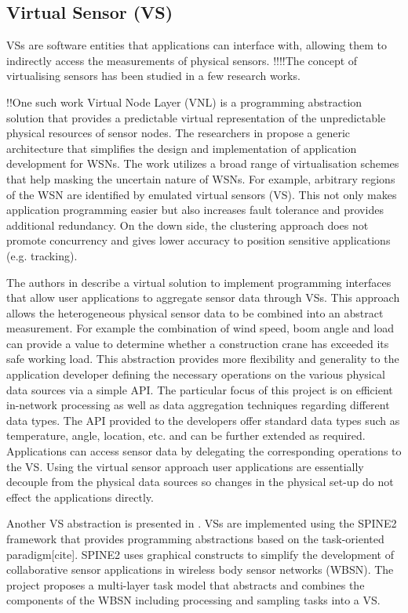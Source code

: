 \subsection{Virtual Sensor (VS)}
VSs are software entities that applications can interface with, allowing them to indirectly access the measurements of physical sensors.
!!!!The concept of virtualising sensors has been studied in a few research works.  

!!One such work Virtual Node Layer (VNL) is a programming abstraction solution that provides a predictable virtual representation of the unpredictable physical resources of sensor nodes. The researchers in \cite{Brown:2007:VNL:1317103.1317105} propose a generic architecture that simplifies the design and implementation of application development for WSNs. The work utilizes a broad range of virtualisation schemes that help masking the uncertain nature of WSNs. For example, arbitrary regions of the WSN are identified by emulated virtual sensors (VS). This not only makes application programming easier but also increases fault tolerance and provides additional redundancy. On the down side, the clustering approach does not promote concurrency and gives lower accuracy to position sensitive applications (e.g. tracking).


The authors in \cite{1648519} describe a virtual solution to implement programming interfaces that allow user applications to aggregate sensor data through VSs. This approach allows the heterogeneous physical sensor data to be combined into an abstract measurement. For example the combination of wind speed, boom angle and load can provide a value to determine whether a construction crane has exceeded its safe working load. This abstraction provides more flexibility and generality to the application developer defining the necessary operations on the various physical data sources via a simple API. The particular focus of this project is on efficient in-network processing as well as data aggregation techniques regarding different data types. The API provided to the developers offer standard data types such as temperature, angle, location, etc. and can be further extended as required. Applications can access sensor data by delegating the corresponding operations to the VS. Using the virtual sensor approach user applications are essentially decouple  from the physical data sources so changes in the physical set-up do not effect the applications directly. 

Another VS abstraction is presented in \cite{5721776}. VSs are implemented using the SPINE2 framework \cite{5346155} that provides programming abstractions based on the task-oriented paradigm[cite]. SPINE2 uses graphical constructs to simplify the development of collaborative sensor applications in wireless body sensor networks (WBSN). The project proposes a multi-layer task model that abstracts and combines the components of the WBSN including processing and sampling tasks into a VS.